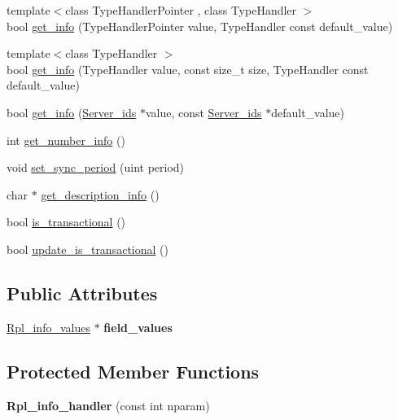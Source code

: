 \begin{DoxyCompactItemize}
\item 
{\footnotesize template$<$class Type\+Handler\+Pointer , class Type\+Handler $>$ }\\bool \mbox{\hyperlink{classRpl__info__handler_a421a0b64ab3e303830ce57982dbfca0a}{get\+\_\+info}} (Type\+Handler\+Pointer value, Type\+Handler const default\+\_\+value)
\item 
{\footnotesize template$<$class Type\+Handler $>$ }\\bool \mbox{\hyperlink{classRpl__info__handler_a80713c966bf9b4e3759390e4a3b3cb8c}{get\+\_\+info}} (Type\+Handler value, const size\+\_\+t size, Type\+Handler const default\+\_\+value)
\item 
bool \mbox{\hyperlink{classRpl__info__handler_a8a4877a840f5d71329dcc57d8fe1bb18}{get\+\_\+info}} (\mbox{\hyperlink{classServer__ids}{Server\+\_\+ids}} $\ast$value, const \mbox{\hyperlink{classServer__ids}{Server\+\_\+ids}} $\ast$default\+\_\+value)
\item 
int \mbox{\hyperlink{classRpl__info__handler_a8d249dc77e85048ff9b5777c86a020b2}{get\+\_\+number\+\_\+info}} ()
\item 
void \mbox{\hyperlink{classRpl__info__handler_a037452d9cdd737962f620d1547835a12}{set\+\_\+sync\+\_\+period}} (uint period)
\item 
char $\ast$ \mbox{\hyperlink{classRpl__info__handler_ab2547938ea10aa15a23549cb69c69393}{get\+\_\+description\+\_\+info}} ()
\item 
bool \mbox{\hyperlink{classRpl__info__handler_ae8a2d0ebeccf92a6c5c953a8ec16ab94}{is\+\_\+transactional}} ()
\item 
bool \mbox{\hyperlink{classRpl__info__handler_a92f9a87194f6b1400e67329515827504}{update\+\_\+is\+\_\+transactional}} ()
\end{DoxyCompactItemize}
\subsection*{Public Attributes}
\begin{DoxyCompactItemize}
\item 
\mbox{\label{classRpl__info__handler_a29df8c4b231bf37a77f646725b07459c}} 
\mbox{\hyperlink{classRpl__info__values}{Rpl\+\_\+info\+\_\+values}} $\ast$ {\bfseries field\+\_\+values}
\end{DoxyCompactItemize}
\subsection*{Protected Member Functions}
\begin{DoxyCompactItemize}
\item 
\mbox{\label{classRpl__info__handler_a300aa93fa7e3e7e5b2cc010165f1d15d}} 
{\bfseries Rpl\+\_\+info\+\_\+handler} (const int nparam)
\end{DoxyCompactItemize}
